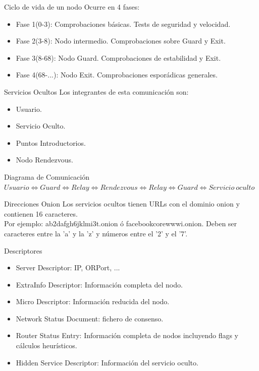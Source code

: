 \documentclass[10pt]{beamer}
\begin{document}
\begin{frame}[fragile]{Ciclo de vida de un nodo}
	\pause
	Ocurre en 4 fases:
	\pause
	\begin{itemize}
		\item<1-> Fase 1(0-3): Comprobaciones básicas. Tests de seguridad y velocidad.\pause
		\item<2-> Fase 2(3-8): Nodo intermedio. Comprobaciones sobre Guard y Exit.\pause
		\item<3-> Fase 3(8-68): Nodo Guard. Comprobaciones de estabilidad y Exit.\pause
		\item<4-> Fase 4(68-...): Nodo Exit. Comprobaciones esporádicas generales.\pause
	\end{itemize}
\end{frame}

\begin{frame}[fragile]{Servicios Ocultos}
	\pause
	Los integrantes de esta comunicación son:
	\pause
	\begin{itemize}
		\item<1-> Usuario.\pause
		\item<2-> Servicio Oculto.\pause
		\item<3-> Puntos Introductorios.\pause
		\item<4-> Nodo Rendezvous.\pause
	\end{itemize}
	\pause
	\begin{block}{Diagrama de Comunicación}
		\footnotesize $Usuario \Leftrightarrow Guard \Leftrightarrow Relay \Leftrightarrow Rendezvous \Leftrightarrow Relay \Leftrightarrow Guard \Leftrightarrow Servicio \ oculto$
	\end{block}
	\pause
	\begin{exampleblock}{Direcciones Onion}
		Los servicios ocultos tienen URLs con el dominio onion y contienen 16 caracteres.\\ Por ejemplo: ab2dafgh6jklmi3t.onion ó facebookcorewwwi.onion.
		Deben ser caracteres entre la 'a' y la 'z' y números entre el '2' y el '7'.
	\end{exampleblock}
\end{frame}

\begin{frame}[fragile]{Descriptores}
	\pause
	\begin{itemize}
		\item<1-> Server Descriptor: IP, ORPort, ... \pause
		\item<2-> ExtraInfo Descriptor: Información completa del nodo. \pause
		\item<3-> Micro Descriptor: Información reducida del nodo. \pause
		\item<4-> Network Status Document: fichero de consenso.\pause
		\item<5-> Router Status Entry: Información completa de nodos incluyendo flags y cálculos heurísticos.\pause
		\item<6-> Hidden Service Descriptor: Información del servicio oculto.\pause
	\end{itemize}
\end{frame}
\end{document}
